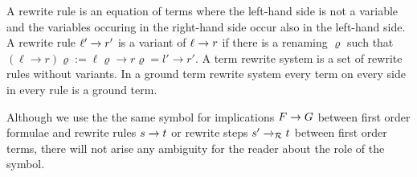 \begin{definition}\label{def:rewriterule}
	A {\myem rewrite rule} is an equation of terms where the left-hand side is not a variable
	and the variables occuring in the right-hand side occur also in the left-hand side.
	A rewrite rule $\ell'\xrightarrow[{}]{} r'$ is a {\myem variant} of $\ell\xrightarrow[{}]{} r$ if there is a renaming $\varrho$
	such that
	$(\ell\rightarrow r)\varrho := \ell\varrho\rightarrow r\varrho = l'\rightarrow r'$.
	A {\myem term rewrite system} is a set of rewrite rules without variants.
	In a {\myem ground} term rewrite system every term on every side in every rule is a ground term.
\end{definition}

Although we use the the same symbol for implications $F\rightarrow G$ between first order formulae
and rewrite rules $s\xrightarrow[{}]{} t$ or rewrite steps $s'\xrightarrow[{}]{}_{\mathcal{R}} t$ between first order terms,
there will not arise any ambiguity for the reader about the role of the symbol.

